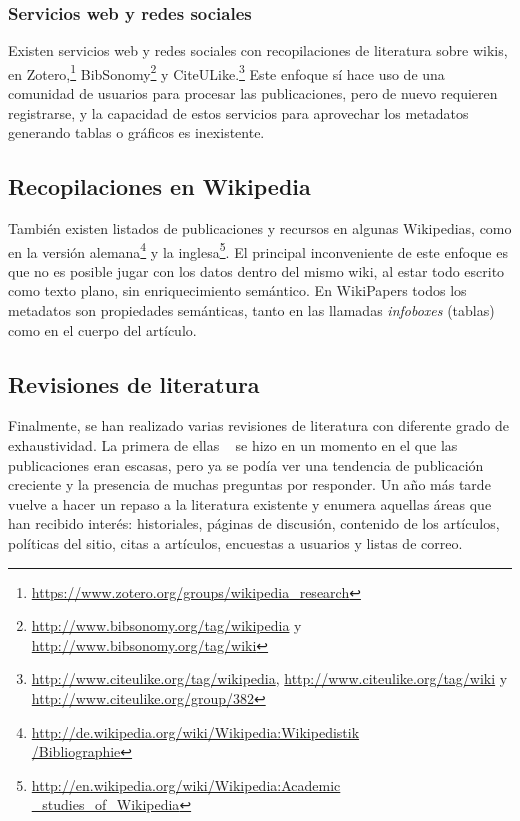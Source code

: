 \documentclass[11pt,twocolumn]{article}
\begin{document}

\subsubsection{Servicios web y redes sociales}
Existen servicios web y redes sociales con recopilaciones de literatura sobre wikis, en Zotero,\footnote{\href{https://www.zotero.org/groups/wikipedia_research}{https://www.zotero.org/groups/wikipedia\_research}} BibSonomy\footnote{\href{http://www.bibsonomy.org/tag/wikipedia}{http://www.bibsonomy.org/tag/wikipedia} y \href{http://www.bibsonomy.org/tag/wiki}{http://www.bibsonomy.org/tag/wiki}} y CiteULike.\footnote{\href{http://www.citeulike.org/tag/wikipedia}{http://www.citeulike.org/tag/wikipedia}, \href{http://www.citeulike.org/tag/wiki}{http://www.citeulike.org/tag/wiki} y \href{http://www.citeulike.org/group/382}{http://www.citeulike.org/group/382}} Este enfoque sí hace uso de una comunidad de usuarios para procesar las publicaciones, pero de nuevo requieren registrarse, y la capacidad de estos servicios para aprovechar los metadatos generando tablas o gráficos es inexistente.

\subsection{Recopilaciones en Wikipedia}
También existen listados de publicaciones y recursos en algunas Wikipedias, como en la versión alemana\footnote{\href{http://de.wikipedia.org/wiki/Wikipedia:Wikipedistik/Bibliographie}{http://de.wikipedia.org/wiki/Wikipedia:Wikipedistik\\ /Bibliographie}} y la inglesa\footnote{\href{http://en.wikipedia.org/wiki/Wikipedia:Academic_studies_of_Wikipedia}{http://en.wikipedia.org/wiki/Wikipedia:Academic\\ \_studies\_of\_Wikipedia}}. El principal inconveniente de este enfoque es que no es posible jugar con los datos dentro del mismo wiki, al estar todo escrito como texto plano, sin enriquecimiento semántico. En WikiPapers todos los metadatos son propiedades semánticas, tanto en las llamadas \emph{infoboxes} (tablas) como en el cuerpo del artículo.

\subsection{Revisiones de literatura}
Finalmente, se han realizado varias revisiones de literatura con diferente grado de exhaustividad. La primera de ellas ~\citep{voss2005} se hizo en un momento en el que las publicaciones eran escasas, pero ya se podía ver una tendencia de publicación creciente y la presencia de muchas preguntas por responder. Un año más tarde ~\citep{ayers2006} vuelve a hacer un repaso a la literatura existente y enumera aquellas áreas que han recibido interés: historiales, páginas de discusión, contenido de los artículos, políticas del sitio, citas a artículos, encuestas a usuarios y listas de correo.
\end{document}

